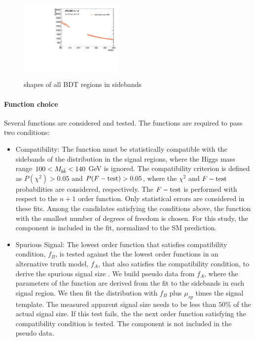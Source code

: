 \begin{figure}[htbp]
 \includegraphics[width=0.45\textwidth]{figures/VBF/Mbb_SRIV_4cen.pdf}\\
\caption{\Mbb{} shapes of all BDT regions in sidebands} 
  \label{fig:vbf-mbb_sidebands}
\end{figure}



\paragraph{Function choice}

Several functions are considered and tested. The functions are required to pass two conditions:

\begin{itemize}
\item 
Compatibility: The function must be statistically  compatible with the sidebands of the \Mbb{} distribution in the signal regions, where the Higgs mass range $100<M_{b\bar{b}}<140$ GeV is ignored. The compatibility criterion is defined as $P(\chi^2)>0.05$ and $P(F-\rm{test})>0.05$,  where the $\chi^2$ and $F-\rm{test}$ probabilities are considered, respectively. The $F-\rm{test}$ is performed with respect to the $n+1$ order function.  Only statistical errors are considered in these fits.  Among the candidates satisfying the conditions above, the function with the smallest number of degrees of freedom is chosen. For this study, the \zjets{} component is included in the fit,  normalized to the SM prediction.


\item Spurious Signal:  The lowest order function that satisfies compatibility condition, $f_{B}$, is tested against the the lowest order functions in an alternative truth model, $f_{A}$, that also satisfies the compatibility condition, to derive the spurious signal size \cite{CMS-HIG-12-028}.  We build pseudo data from $f_{A}$, where the parameters of the function are derived from the fit to the sidebands in each signal region.  We then fit the distribution with $f_{B}$ plus $\mu_{sp}$ times the signal template. The measured  apparent signal size needs to be less than $50\%$ of the actual signal size. If this test fails, the the next order function satisfying the compatibility condition is tested.  The \zjets{} component is not included in the pseudo data.

\end{itemize}

